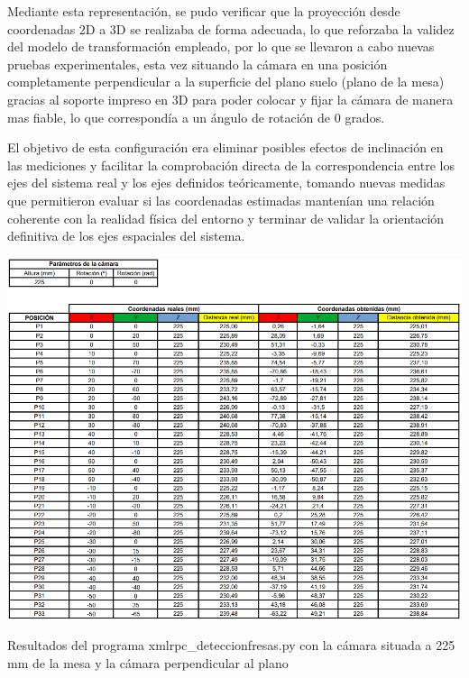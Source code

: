 Mediante esta representación, se pudo verificar que la proyección desde coordenadas 2D a 3D se realizaba de forma adecuada, lo que reforzaba la validez del modelo de transformación empleado, por lo que se llevaron a cabo nuevas pruebas experimentales, esta vez situando la cámara en una posición completamente perpendicular a la superficie del plano suelo (plano de la mesa) gracias al soporte impreso en 3D para poder colocar y fijar la cámara de manera mas fiable, lo que correspondía a un ángulo de rotación de 0 grados. 

El objetivo de esta configuración era eliminar posibles efectos de inclinación en las mediciones y facilitar la comprobación directa de la correspondencia entre los ejes del sistema real y los ejes definidos teóricamente, tomando nuevas medidas que permitieron evaluar si las coordenadas estimadas mantenían una relación coherente con la realidad física del entorno y terminar de validar la orientación definitiva de los ejes espaciales del sistema.

  \begin{table}[H]
     \centering
     \begin{center}
       \includegraphics[width=155mm]{figs/Resultados 225 mm 0 grados.png}
     \end{center}
     \caption{Resultados del programa xmlrpc\_deteccionfresas.py con la cámara situada a 225 mm de la mesa y la cámara perpendicular al plano}
     \label{tab:resultados_180mm_58grados}
  \end{table}

